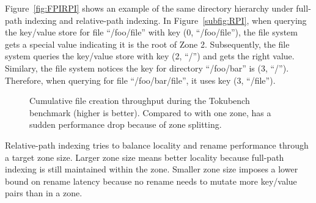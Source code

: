 Figure~\ref{fig:FPIRPI} shows an example of the same directory hierarchy under
full-path indexing and relative-path indexing.
In Figure~\ref{subfig:RPI}, when querying the key/value store for file
``/foo/file'' with key (0, ``/foo/file''), the file system gets a special value
indicating it is the root of Zone 2.
Subsequently, the file system queries the key/value store with key (2, ``/'')
and gets the right value.
Similary, the file system notices the key for directory ``/foo/bar'' is
(3, ``/'').
Therefore, when querying for file ``/foo/bar/file'', it uses key (3, ``/file'').

\newcommand{\addTokubenchZonePlot}[1]
{
    \addplot[
        color=\pgfkeysvalueof{/fs-colors/#1},
        line width=0.75pt,
        mark=\pgfkeysvalueof{/fs-marks/#1},
    ]
    plot[
    ]
    table[
    ]
    {./data/tokuzone/#1.csv};
    \addlegendentry{\pgfkeysvalueof{/fs-names/#1}}
}

\begin{figure}[t]
    \centering
    \caption[Zone maintainance cost in TokuBench benchmark]{Cumulative file creation
        throughput during the Tokubench benchmark (higher is better).
        Compared to \betrfsThree with one zone, \betrfsThree has a sudden
        performance drop because of zone splitting.}
    \label{fig:tokuzone}
\end{figure}

Relative-path indexing tries to balance locality and rename performance through
a target zone size.
Larger zone size means better locality because full-path indexing is still
maintained within the zone.
Smaller zone size imposes a lower bound on rename latency
because no rename needs to mutate more key/value pairs than in a zone.

